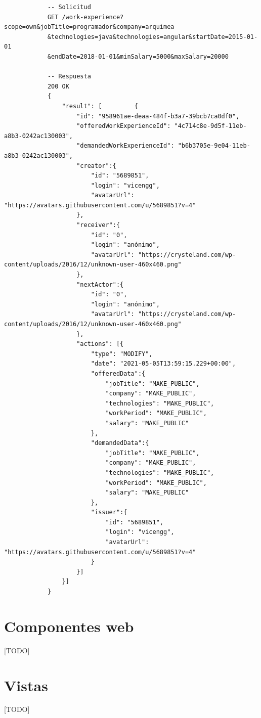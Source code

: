 \documentclass[a4paper, 12pt]{book}
\begin{document}
			{\footnotesize
			\begin{verbatim}
			-- Solicitud
			GET /work-experience?scope=own&jobTitle=programador&company=arquimea
			&technologies=java&technologies=angular&startDate=2015-01-01
			&endDate=2018-01-01&minSalary=5000&maxSalary=20000

			-- Respuesta
			200 OK
			{
			    "result": [			{
			        "id": "958961ae-deaa-484f-b3a7-39bcb7ca0df0",
			        "offeredWorkExperienceId": "4c714c8e-9d5f-11eb-a8b3-0242ac130003",
			        "demandedWorkExperienceId": "b6b3705e-9e04-11eb-a8b3-0242ac130003",
			        "creator":{
			            "id": "5689851",
			            "login": "vicengg",
			            "avatarUrl": "https://avatars.githubusercontent.com/u/5689851?v=4"
			        },
			        "receiver":{
			            "id": "0",
			            "login": "anónimo",
			            "avatarUrl": "https://crysteland.com/wp-content/uploads/2016/12/unknown-user-460x460.png"
			        },
			        "nextActor":{
			            "id": "0",
			            "login": "anónimo",
			            "avatarUrl": "https://crysteland.com/wp-content/uploads/2016/12/unknown-user-460x460.png"
			        },
			        "actions": [{
			            "type": "MODIFY",
			            "date": "2021-05-05T13:59:15.229+00:00",
			            "offeredData":{
			                "jobTitle": "MAKE_PUBLIC",
			                "company": "MAKE_PUBLIC",
			                "technologies": "MAKE_PUBLIC",
			                "workPeriod": "MAKE_PUBLIC",
			                "salary": "MAKE_PUBLIC"
			            },
			            "demandedData":{
			                "jobTitle": "MAKE_PUBLIC",
			                "company": "MAKE_PUBLIC",
			                "technologies": "MAKE_PUBLIC",
			                "workPeriod": "MAKE_PUBLIC",
			                "salary": "MAKE_PUBLIC"
			            },
			            "issuer":{
			                "id": "5689851",
			                "login": "vicengg",
			                "avatarUrl": "https://avatars.githubusercontent.com/u/5689851?v=4"
			            }
			        }]
			    }]
			}
			\end{verbatim}
			}

\section{Componentes web} 
\label{sec:web_components}
[TODO]

\section{Vistas} 
\label{sec:views}
[TODO]
\end{document}
